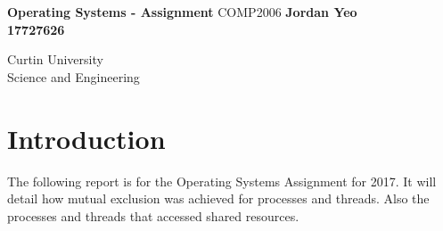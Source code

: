 \documentclass[]{article}
\begin{document}

\begin{titlepage}
	\begin{center}
		\vspace*{1cm}
		\LARGE\textbf{Operating Systems - Assignment}
		\break
		COMP2006
		\vspace{1cm}
		\break
		\Large\textbf{Jordan Yeo \\17727626} 
		\vspace{3cm}

		
		\vspace{14.0cm}
		\normalsize
		Curtin University \\
		Science and Engineering \\
		
	\end{center}
\end{titlepage}

\tableofcontents
\pagebreak


\section*{Introduction}
The following report is for the Operating Systems Assignment for 2017. It will detail how mutual exclusion was achieved for processes and threads. Also the processes and threads that accessed shared resources.
\end{document}
